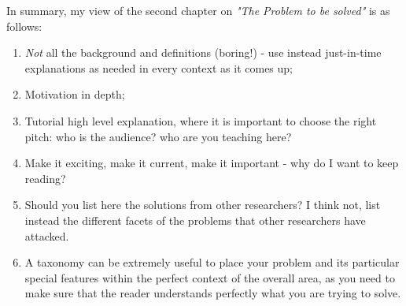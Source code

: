 In summary, my view of the second chapter on
\textit{"The Problem to be solved"} is as follows:
\begin{enumerate}
\item {\textit{Not} all the background and definitions (boring!) - use instead just-in-time explanations as needed in every context as it comes up;}
\item {Motivation in depth;}
\item {Tutorial high level explanation, where it is important to choose the right pitch: who is the audience? who are you teaching here?}
\item {Make it exciting, make it current, make it important - why do I want to keep reading?}
\item {Should you list here the solutions from other researchers? I think not, list instead the different facets of the problems that other researchers have attacked.}
\item {A taxonomy can be extremely useful to place your problem and its particular special features within the perfect context of the overall area, as you need to make sure that the reader understands perfectly what you are trying to solve.}
\end{enumerate}


\setlength{\unitlength}{\savedunitlength}
